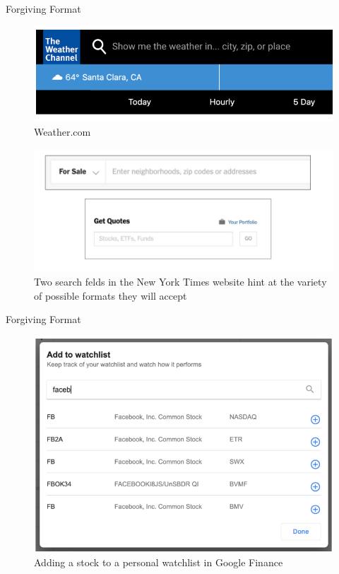 \documentclass{beamer}
\begin{document}
\begin{frame}[t]{Forgiving Format}
	\begin{figure}[h]
		\centering
		\includegraphics[scale=0.6]{images/lec08-pic30.png}
		\caption{Weather.com}
	\end{figure}
	
	\begin{figure}[h]
		\centering
		\includegraphics[scale=0.6]{images/lec08-pic31.png}
		\caption{Two search felds in the New York Times website hint at the variety of possible formats they will accept}
	\end{figure}	
\end{frame}

\begin{frame}[t]{Forgiving Format}
	\begin{figure}[h]
		\centering
		\includegraphics[scale=0.6]{images/lec08-pic32.png}
		\caption{Adding a stock to a personal watchlist in Google Finance}
	\end{figure}
\end{frame}
\end{document}
